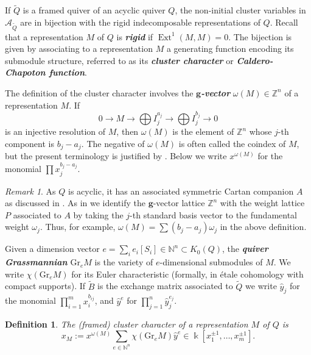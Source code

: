 \documentclass[12pt]{amsart}
\newcommand{\newword}[1]{\textbf{\emph{#1}}}
\newcommand{\cA}{\mathcal{A}}
\newcommand{\NN}{\mathbb{N}}
\newcommand{\ZZ}{\mathbb{Z}}
\newcommand{\kk}{\Bbbk}
\newcommand{\bfg}{\mathbf{g}}
\newcommand{\gv}{\omega}
\newcommand{\grep}{\gv}
\newcommand{\KQ}{K_0(Q)}
\newcommand{\Gr}{\mathrm{Gr}}
\DeclareMathOperator{\Ext}{Ext}
\newcommand{\Qrep}{M}
\newtheorem{definition}[theorem]{Definition}
\theoremstyle{remark}
\newtheorem{remark}[theorem]{Remark}
\numberwithin{equation}{section}
\numberwithin{figure}{section}
\begin{document}
If $\widetilde{Q}$ is a framed quiver of an acyclic quiver $Q$, the non-initial cluster variables in $\cA_{\widetilde{Q}}$ are in bijection with the rigid indecomposable representations of $Q$. 
Recall that a representation $M$ of $Q$ is \newword{rigid} if $\Ext^1(M,M) = 0$. 
The bijection is given by associating to a representation $M$ a generating function encoding its submodule structure, referred to as its \newword{cluster character} or \newword{Caldero-Chapoton function}.

The definition of the cluster character involves the \newword{$\bfg$-vector} $\grep(\Qrep)\in\ZZ^n$ of a representation $\Qrep$.
If
\[
  0 \to \Qrep \to \bigoplus I_j^{a_j} \to \bigoplus I_j^{b_j} \to 0
\]
is an injective resolution of $M$, then $\grep(\Qrep)$ is the element of $\ZZ^n$ whose $j$-th component is $b_j - a_j$. The negative of $\grep(\Qrep)$ is often called the coindex of $M$, but the present terminology is justified by . 
Below we write $x^{\grep(\Qrep)}$ for the monomial $\prod x_j^{b_j - a_j}$.

\begin{remark}
As $Q$ is acyclic, it has an associated symmetric Cartan companion $A$ as discussed in . As in  we identify the $\bfg$-vector lattice $\ZZ^n$ with the weight lattice $P$ associated to $A$ by taking the $j$-th standard basis vector to the fundamental weight $\omega_j$. Thus, for example, $\grep(\Qrep) = \sum (b_j - a_j)\omega_j$ in the above definition. 
\end{remark}

Given a dimension vector $e = \sum_i e_i[S_i] \in \NN^n \subset \KQ$, the \newword{quiver Grassmannian} $\Gr_eM$ is the variety of $e$-dimensional submodules of $M$.
We write $\chi(\Gr_eM)$ for its Euler characteristic (formally, in \'etale cohomology with compact supports). If $\widetilde{B}$ is the exchange matrix associated to $\widetilde{Q}$ we write $\hat{y}_j$ for the monomial $\prod\limits_{i=1}^m x_i^{b_{ij}}$, and $\hat{y}^e$ for $\prod_{j=1}^n \hat{y}_j^{e_j}$.

\begin{definition}
  The (framed) cluster character of a representation $M$ of $Q$ is
  \begin{equation}
    \label{eq:cc formula}
    x_M := x^{\grep(M)} \sum_{e \in \NN^n}\chi(\Gr_e M) \hat{y}^e \in \kk[x_1^{\pm 1},\dotsc,x_m^{\pm 1}].
  \end{equation}
\end{definition}
\end{document}
